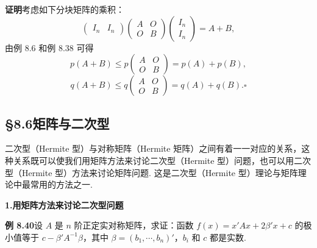 \documentclass[UTF8,12pt,a4paper,fontset=fandol]{ctexart}
\begin{document}
\noindent\textbf{证明}\quad 考虑如下分块矩阵的乘积：
\[
\left(\begin{array}{cc}I_n&I_n\end{array}\right)
\left(\begin{array}{cc}
A & O\\
O & B
\end{array}\right)
\left(\begin{array}{c}
I_n\\
I_n
\end{array}\right)=A+B,
\]
由例 8.6 和例 8.38 可得
\[
p(A+B)\le p\left(\begin{array}{cc}A&O\\ O&B\end{array}\right)=p(A)+p(B),
\]
\[
q(A+B)\le q\left(\begin{array}{cc}A&O\\ O&B\end{array}\right)=q(A)+q(B). \ensuremath{\square}
\]

\subsection*{§8.6\quad 矩阵与二次型}

二次型（Hermite 型）与对称矩阵（Hermite 矩阵）之间有着一一对应的关系，这种关系既可以使我们用矩阵方法来讨论二次型（Hermite 型）问题，也可以用二次型（Hermite 型）方法来讨论矩阵问题. 这是二次型（Hermite 型）理论与矩阵理论中最常用的方法之一.

\noindent\textbf{1.\quad 用矩阵方法来讨论二次型问题}

\noindent\textbf{例 8.40}\quad 设 $A$ 是 $n$ 阶正定实对称矩阵，求证：函数 $f(x)=x'Ax+2\beta'x+c$ 的极小值等于 $c-\beta'A^{-1}\beta$，其中 $\beta=(b_1,\cdots,b_n)'$，$b_i$ 和 $c$ 都是实数.
\end{document}
